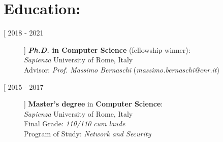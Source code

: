 \documentclass[10pt]{article} %
\begin{document}

\section*{Education:} 

\begin{description}
\item[[ 2018 - 2021]] \textbf{\textit{Ph.D.}  in  Computer Science} (fellowship winner):\\
\textit{Sapienza} University of Rome, Italy\\
Advisor: \textit{Prof. Massimo Bernaschi} (\textit{massimo.bernaschi@cnr.it})\\


\item[[ 2015 - 2017]] \textbf{Master's degree} in  \textbf{Computer Science}: \\
\textit{Sapienza} University of Rome, Italy\\
Final Grade: \textit{110/110} \textit{cum laude}\\
Program of Study: \textit{Network and Security}

\end{description}


\noindent\makebox[\linewidth]{\rule{.2\paperwidth}{0.3pt}}
\end{document}
